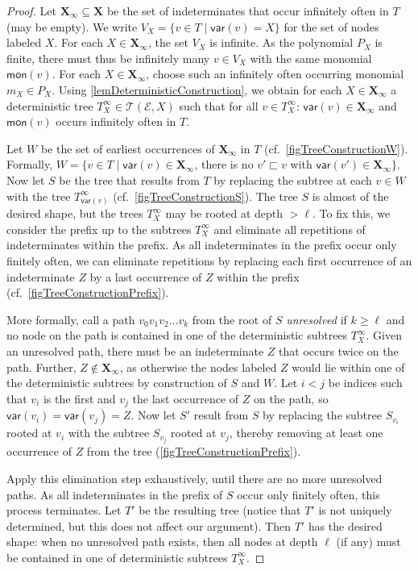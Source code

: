 \documentclass[english,runningheads,a4paper,envcountsame]{llncs}
\newcommand*{\XX}{{\bm X}}
\newcommand*{\EE}{\mathcal{E}}
\newcommand*{\mon}{\mathsf{mon}}
\newcommand*{\var}{\mathsf{var}}
\newcommand*{\Trees}{\mathcal{T}}
\newcommand{\prefixneq}{\sqsubset}
\begin{document}
\begin{proof}
Let $\XX_\infty \subseteq \XX$ be the set of indeterminates that occur infinitely often in $T$ (may be empty).
We write $V_X = \{ v \in T \mid \var(v) = X \}$ for the set of nodes labeled $X$.
For each $X \in \XX_\infty$, the set $V_X$ is infinite.
As the polynomial $P_X$ is finite, there must thus be infinitely many $v \in V_X$ with the same monomial $\mon(v)$.
For each $X \in \XX_\infty$, choose such an infinitely often occurring monomial $m_X \in P_X$.
Using \cref{lemDeterministicConstruction}, we obtain for each $X \in \XX_\infty$ a deterministic tree $T^\infty_X \in \Trees(\EE,X)$ such that for all $v \in T^\infty_X$: $\var(v) \in \XX_\infty$ and $\mon(v)$ occurs infinitely often in $T$.

Let $W$ be the set of earliest occurrences of $\XX_\infty$ in $T$ (cf.\ \cref{figTreeConstructionW}). Formally,
$W = \{ v \in T \mid \var(v) \in \XX_\infty$, there is no $v' \prefixneq v$ with $\var(v') \in \XX_\infty \}$.
Now let $S$ be the tree that results from $T$ by replacing the subtree at each $v \in W$ with the tree $T^\infty_{\var(v)}$ (cf.\ \cref{figTreeConstructionS}).
The tree $S$ is almost of the desired shape, but the trees $T^\infty_X$ may be rooted at depth $> \ell$.
To fix this, we consider the prefix up to the subtrees $T^\infty_X$ and eliminate all repetitions of indeterminates within the prefix.
As all indeterminates in the prefix occur only finitely often, we can eliminate repetitions by replacing each first occurrence of an indeterminate $Z$ by a last occurrence of $Z$ within the prefix (cf.\ \cref{figTreeConstructionPrefix}).

More formally, call a path $v_0 v_1 v_2 \dots v_k$ from the root of $S$ \emph{unresolved} if
$k \ge \ell$ and no node on the path is contained in one of the deterministic subtrees $T_X^\infty$.
Given an unresolved path, there must be an indeterminate $Z$ that occurs twice on the path.
Further, $Z \notin \XX_\infty$, as otherwise the nodes labeled $Z$ would lie within one of the deterministic subtrees by construction of $S$ and $W$.
Let $i < j$ be indices such that $v_i$ is the first and $v_j$ the last occurrence of $Z$ on the path, so $\var(v_i) = \var(v_j) = Z$.
Now let $S'$ result from $S$ by replacing the subtree $S_{v_i}$ rooted at $v_i$ with the subtree $S_{v_j}$ rooted at $v_j$, thereby removing at least one occurrence of $Z$ from the tree (\cref{figTreeConstructionPrefix}).

Apply this elimination step exhaustively, until there are no more unresolved paths.
As all indeterminates in the prefix of $S$ occur only finitely often, this process terminates.
Let $T'$ be the resulting tree (notice that $T'$ is not uniquely determined, but this does not affect our argument).
Then $T'$ has the desired shape: when no unresolved path exists, then all nodes at depth $\ell$ (if any) must be contained in one of deterministic subtrees $T_X^\infty$.


\end{proof}
\end{document}

